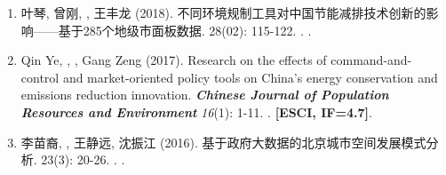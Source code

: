 \begin{enumerate}
\item
    叶琴, 曾刚, {}, 王丰龙 (2018).
	不同环境规制工具对中国节能减排技术创新的影响——基于285个地级市面板数据.
    \textbf{} 28(02): 115-122.
    .  
    \textbf{}.
\item
    Qin Ye\CS, \Shaoqing, , Gang Zeng (2017).
    Research on the effects of command-and-control and market-oriented policy tools on China’s energy conservation and emissions reduction innovation.
    \textbf{\textit{Chinese Journal of Population Resources and Environment}} \textit{16}(1): 1-11.
    . 
    \textbf{[ESCI, IF=4.7]}.
\item
   李苗裔, {}, 王静远, 沈振江 (2016).
	基于政府大数据的北京城市空间发展模式分析.
    \textbf{} 23(3): 20-26.
    .  
    \textbf{\heiti{[JST]}}.
\end{enumerate}

